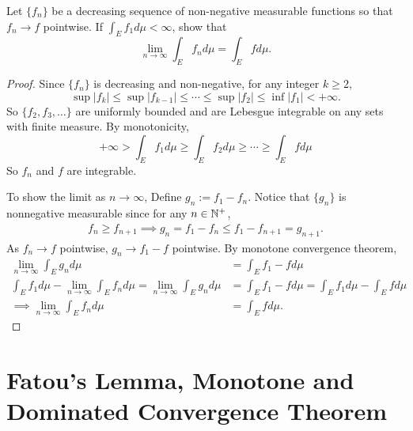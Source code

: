 \documentclass[class=book, crop=false]{standalone}
\begin{document}
        \begin{question}
            Let $\{f_n\}$ be a decreasing sequence of non-negative measurable functions so that $f_n \rightarrow f$ pointwise. If $\int_E f_1 d\mu < \infty$, show that
            \begin{equation*}
                \lim_{n \rightarrow \infty} \int_E f_n d\mu = \int_E f d\mu.
            \end{equation*}
        \end{question}
        \begin{proof}
            Since $\{f_n\}$ is decreasing and non-negative, for any integer $k \geq 2$,
            \begin{equation*}
                \sup|f_{k}| \leq \sup|f_{k - 1}| \leq \cdots \leq \sup|f_{2}| \leq \inf|f_1| < +\infty.
            \end{equation*}
            So $\{f_2, f_3, \dots\}$ are uniformly bounded and are Lebesgue integrable on any sets with finite measure. By monotonicity,
            \begin{equation*}
                +\infty > \int_{E} f_1 d\mu \geq \int_E f_2 d\mu \geq \cdots \geq \int_E f d\mu
            \end{equation*}
            So $f_n$ and $f$ are integrable.

            \noindent To show the limit as $n \rightarrow \infty$, Define $g_n := f_1 - f_n$. Notice that $\{g_n\}$ is nonnegative measurable since for any $n \in \mathbb{N}^{+}$,
            \begin{align*}
                f_n \geq f_{n + 1} \implies g_n = f_1 - f_n \leq f_1 - f_{n + 1} = g_{n + 1}.
            \end{align*}
            As $f_n \rightarrow f$ pointwise, $g_n \rightarrow f_1 - f$ pointwise. By monotone convergence theorem,
            \begin{align*}
                \lim_{n \rightarrow \infty} \int_E g_n d\mu &= \int_E f_1 - f d\mu \\
                \int_E f_1 d\mu - \lim_{n \rightarrow \infty} \int_E f_n d\mu = \lim_{n \rightarrow \infty} \int_E g_n d\mu &= \int_E f_1 - f d\mu = \int_E f_1 d\mu - \int_{E} f d\mu \\
                \implies \lim_{n \rightarrow \infty} \int_E f_n d\mu &= \int_{E} f d\mu.
            \end{align*}
        \end{proof}


    \section{Fatou’s Lemma, Monotone and Dominated Convergence Theorem}
\end{document}
